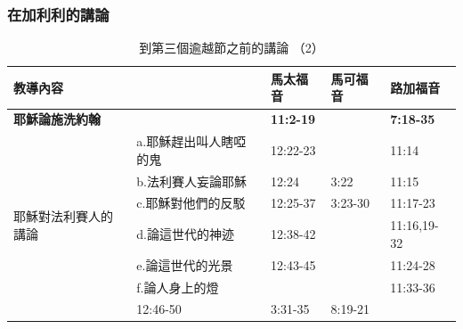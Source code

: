 \subsubsection{在加利利的講論}
\begin{table}[htbp]
  \centering
    \begin{tabular}{|p{5.43em}|l|p{6.645em}|p{5.355em}|p{5.145em}|}
    \toprule
    \multicolumn{2}{|p{18.645em}|}{教導內容} & 馬太福音  & 馬可福音  & 路加福音 \\
    \midrule
    \multicolumn{2}{|p{18.645em}|}{\textbf{耶穌論施洗約翰}} & \textbf{11:2-19} & \multicolumn{1}{l|}{} & \textbf{7:18-35} \\
    \midrule
    \multirow{7}{*}{\parbox{0.08\textwidth}{耶穌對法利賽人的講論}} & \multicolumn{1}{p{13.215em}|}{a.耶穌趕出叫人瞎啞的鬼} & 12:22-23 &  & \multicolumn{1}{l|}{11:14} \\
\cmidrule{2-5}    \multicolumn{1}{|l|}{} & \multicolumn{1}{p{13.215em}|}{b.法利賽人妄論耶穌} & \multicolumn{1}{l|}{12:24} & \multicolumn{1}{l|}{3:22} & \multicolumn{1}{l|}{11:15} \\
\cmidrule{2-5}     & \multicolumn{1}{p{13.215em}|}{c.耶穌對他們的反駁} & 12:25-37 & 3:23-30 & 11:17-23 \\
\cmidrule{2-5}    \multicolumn{1}{|l|}{} & d.論這世代的神迹 & 12:38-42 & \multicolumn{1}{l|}{} & \multicolumn{1}{l|}{11:16,19-32} \\
\cmidrule{2-5}    \multicolumn{1}{|l|}{} & \multicolumn{1}{p{13.215em}|}{e.論這世代的光景} & 12:43-45 & \multicolumn{1}{l|}{} & 11:24-28 \\
\cmidrule{2-5}    \multicolumn{1}{|l|}{} & \multicolumn{1}{p{13.215em}|}{f.論人身上的燈} & \multicolumn{1}{l|}{} & \multicolumn{1}{r|}{} & 11:33-36 \\
    \midrule
    \multicolumn{2}{|p{18.645em}|}{耶穌論親屬} & 12:46-50 & 3:31-35 & 8:19-21 \\
    \bottomrule
    \end{tabular}%
     \caption{到第三個逾越節之前的講論 （2）}
  \label{tab:addlabel}%
\end{table}%

